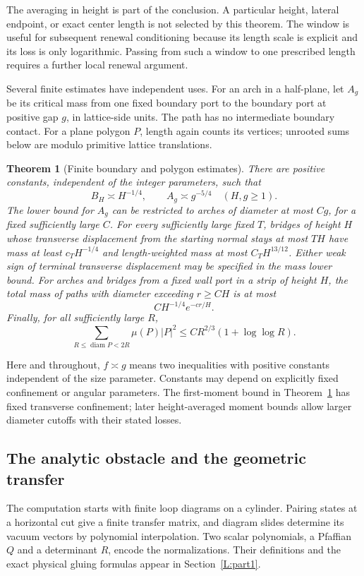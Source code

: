 \documentclass[11pt]{article}
\numberwithin{equation}{section}
\newtheorem{theorem}{Theorem}[section]
\theoremstyle{definition}\newtheorem{definition}[theorem]{Definition}
\theoremstyle{remark}\newtheorem{remark}[theorem]{Remark}
\DeclareMathOperator{\diam}{diam}
\begin{document}
The averaging in height is part of the conclusion. A particular height,
lateral endpoint, or exact center length is not selected by this theorem.
The window is useful for subsequent renewal conditioning because its length
scale is explicit and its loss is only logarithmic. Passing from such a
window to one prescribed length requires a further local renewal argument.

Several finite estimates have independent uses. For an arch in a half-plane,
let $A_g$ be its critical mass from one fixed boundary port to the boundary
port at positive gap $g$, in lattice-side units. The path has no intermediate
boundary contact. For a plane polygon $P$, length again counts its vertices;
unrooted sums below are modulo primitive lattice translations.

\begin{theorem}[Finite boundary and polygon estimates]\label{L:thm:finite}
There are positive constants, independent of the integer parameters, such
that
\[
 B_H\asymp H^{-1/4},\qquad A_g\asymp g^{-5/4}\quad(H,g\ge1).
\]
The lower bound for $A_g$ can be restricted to arches of diameter at most
$C g$, for a fixed sufficiently large $C$.
For every sufficiently large fixed $T$, bridges of height $H$ whose
transverse displacement from the starting normal stays at most $TH$
have mass at least $c_T H^{-1/4}$ and length-weighted mass at most
$C_T H^{13/12}$. Either weak sign of terminal transverse displacement
may be specified in the mass lower bound.
For arches and bridges from a fixed wall port in a strip of height $H$,
the total mass of paths with diameter exceeding $r\ge C H$ is at most
\[
 C H^{-1/4}e^{-c r/H}.
\]
Finally, for all sufficiently large $R$,
\[
 \sum_{R\le\diam P<2R}\mu(P)|P|^2
 \le C R^{2/3}(1+\log\log R).
\]
\end{theorem}

Here and throughout, $f\asymp g$ means two inequalities with positive
constants independent of the size parameter. Constants may depend on
explicitly fixed confinement or angular parameters. The first-moment
bound in Theorem~\ref{L:thm:finite} has fixed transverse confinement; later
height-averaged moment bounds allow larger diameter cutoffs with their
stated losses.

\subsection{The analytic obstacle and the geometric transfer}
The computation starts with finite loop diagrams on a cylinder. Pairing
states at a horizontal cut give a finite transfer matrix, and diagram
slides determine its vacuum vectors by polynomial interpolation. Two
scalar polynomials, a Pfaffian $Q$ and a determinant $R$, encode the
normalizations. Their definitions and the exact physical gluing formulas
appear in Section~\ref{L:part1}.
\end{document}
